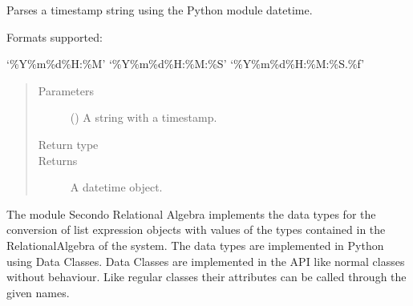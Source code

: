 \documentclass[letterpaper,10pt,english]{sphinxmanual}
\begin{document}
\begin{fulllineitems}
\label{\detokenize{index:secondodb.api.algebras.secondospatiotemporalalgebra.parse_timestamp}}
Parses a timestamp string using the Python module datetime.

Formats supported:

‘\%Y\sphinxhyphen{}\%m\sphinxhyphen{}\%d\sphinxhyphen{}\%H:\%M’
‘\%Y\sphinxhyphen{}\%m\sphinxhyphen{}\%d\sphinxhyphen{}\%H:\%M:\%S’
‘\%Y\sphinxhyphen{}\%m\sphinxhyphen{}\%d\sphinxhyphen{}\%H:\%M:\%S.\%f’
\begin{quote}\begin{description}
\item[{Parameters}] \leavevmode
{} () \textendash{} A string with a timestamp.

\item[{Return type}] \leavevmode
{}

\item[{Returns}] \leavevmode
A datetime object.

\end{description}\end{quote}

\end{fulllineitems}



\label{\detokenize{index:module-secondodb.api.algebras.secondorelationalalgebra}}
The module Secondo Relational Algebra implements the data types for the conversion of list expression objects with
values of the types contained in the RelationalAlgebra of the  system. The data types are implemented in Python
using Data Classes. Data Classes are implemented in the API like normal classes without behaviour.
Like regular classes their attributes can be called through the given names.
\end{document}
